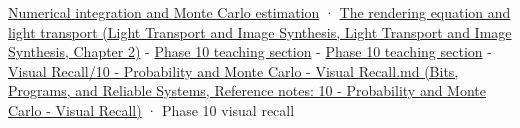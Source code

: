 \hyperref[03-visual-computing-i-ch012-numerical-integration-and-monte-carlo-estimation]{Numerical integration and Monte Carlo estimation} · \href{../04-Light-Transport-and-Image-Synthesis/main.pdf\#nameddest=03-visual-computing-i-ch007-the-rendering-equation-and-light-transport}{The rendering equation and light transport (Light Transport and Image Synthesis, Light Transport and Image Synthesis, Chapter 2)} - \hyperref[02-foundations-ii-ch030-monte-carlo-estimates-trade-computation-for-uncertainty]{Phase 10 teaching section} - \hyperref[02-foundations-ii-ch029-transformations-turn-simple-inputs-into-useful-samples]{Phase 10 teaching section} - \href{../01-Bits-Programs-and-Reliable-Systems/main.pdf\#nameddest=appendix-cb5af353ef77}{Visual Recall/10 - Probability and Monte Carlo - Visual Recall.md (Bits, Programs, and Reliable Systems, Reference notes: 10 - Probability and Monte Carlo - Visual Recall)} · Phase 10 visual recall
